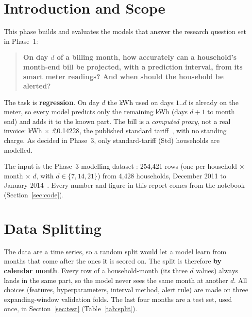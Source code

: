 \documentclass[11pt,letterpaper]{article}
\begin{document}
\maketitleblock

\section{Introduction and Scope}
\label{sec:intro}

This phase builds and evaluates the models that answer the research question set in Phase~1:

\begin{quote}
\textbf{On day $d$ of a billing month, how accurately can a household's month-end bill be projected, with a
prediction interval, from its smart meter readings? And when should the household be alerted?}
\end{quote}

The task is \textbf{regression}. On day $d$ the kWh used on days $1..d$ is already on the meter, so every model
predicts only the remaining kWh (days $d{+}1$ to month end) and adds it to the known part. The bill is a
\emph{computed proxy}, not a real invoice: kWh $\times$ \pounds 0.14228, the published standard
tariff~\cite{datastore_smartmeters}, with no standing charge. As decided in Phase~3, only standard-tariff (Std)
households are modelled.

The input is the Phase~3 modelling dataset : 254,421 rows (one per
household $\times$ month $\times$ $d$, with $d \in \{7, 14, 21\}$) from 4,428 households, December 2011 to January
2014~\cite{kaggle_smartmeters}. Every number and figure in this report comes from the notebook
 (Section~\ref{sec:code}).

\section{Data Splitting}
\label{sec:split}

The data are a time series, so a random split would let a model learn from months that come after the ones it is
scored on. The split is therefore \textbf{by calendar month}. Every row of a household-month (its three $d$
values) always lands in the same part, so the model never sees the same month at another $d$. All choices
(features, hyperparameters, interval method, alert rule) are made on three expanding-window validation folds. The
last four months are a test set, used once, in Section~\ref{sec:test} (Table~\ref{tab:split}).
\end{document}
